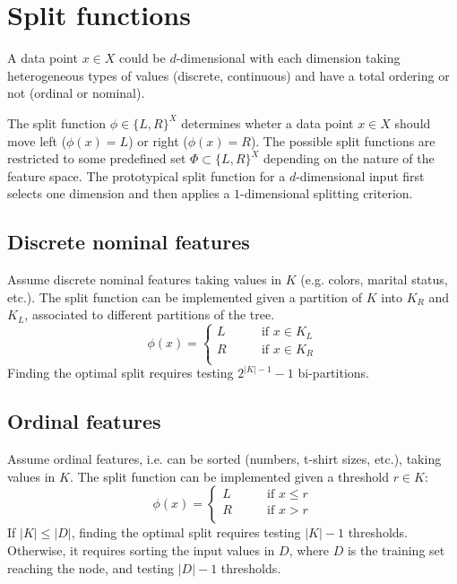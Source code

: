 \section{Split functions}
A data point \(x \in X\) could be \(d\)-dimensional with each dimension taking heterogeneous types of values (discrete, continuous) and have a total ordering or not (ordinal or nominal).

The split function \(\phi \in \{L,R\}^X\) determines wheter a data point \(x \in X\) should move left (\(\phi(x) = L\)) or right (\(\phi(x) = R\)). The possible split functions are restricted to some predefined set \(\Phi \subset \{L,R\}^X\) depending on the nature of the feature space. The prototypical split function for a \(d\)-dimensional input first selects one dimension and then applies a \(1\)-dimensional splitting criterion.

\subsection{Discrete nominal features}
Assume discrete nominal features taking values in \(K\) (e.g. colors, marital status, etc.). The split function can be implemented given a partition of \(K\) into \(K_R\) and \(K_L\), associated to different partitions of the tree.
\begin{equation}
    \phi(x) = \begin{cases}
        L \qquad &\text{if }x \in K_L \\
        R \qquad &\text{if }x \in K_R \\
    \end{cases}
\end{equation}
Finding the optimal split requires testing \(2^{|K|-1}-1\) bi-partitions.

\subsection{Ordinal features}
Assume ordinal features, i.e. can be sorted (numbers, t-shirt sizes, etc.), taking values in \(K\). The split function can be implemented given a threshold \(r \in K\):
\begin{equation}
    \phi(x) = \begin{cases}
        L \qquad &\text{if }x \leq r \\
        R \qquad &\text{if }x > r \\
    \end{cases}
\end{equation}
If \(|K| \leq |D|\), finding the optimal split requires testing \(|K|-1\) thresholds. Otherwise, it requires sorting the input values in \(D\), where \(D\) is the training set reaching the node, and testing \(|D|-1\) thresholds.

